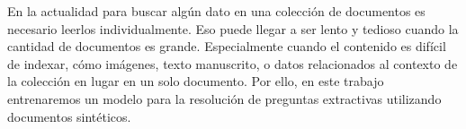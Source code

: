 \documentclass[../main.tex]{subfiles}
\begin{document}

%
%
%



En la actualidad para buscar algún dato en una colección de documentos es necesario leerlos individualmente.
Eso puede llegar a ser lento y tedioso cuando la cantidad de documentos es grande.
Especialmente cuando el contenido es difícil de indexar,
cómo imágenes,
texto manuscrito,
o datos relacionados al contexto de la colección en lugar en un solo documento.
Por ello, en este trabajo entrenaremos un modelo para la resolución de preguntas extractivas utilizando documentos sintéticos.
\end{document}
